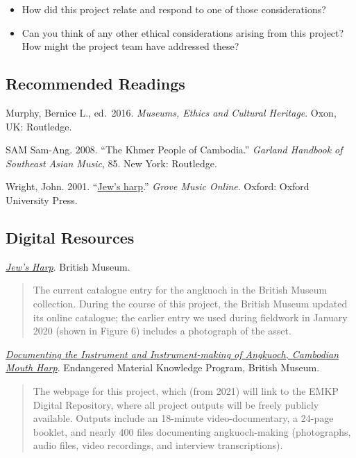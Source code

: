 \documentclass[twoside]{article}
\begin{document}
\begin{itemize}
\item
  How did this project relate and respond to one of those
  considerations?
\item
  Can you think of any other ethical considerations arising from this
  project? How might the project team have addressed these?
\end{itemize}

\hypertarget{recommended-readings}{%
\subsection*{Recommended Readings}\label{recommended-readings}}

Murphy, Bernice L., ed.~2016. \emph{Museums, Ethics and
Cultural Heritage}. Oxon, UK: Routledge.

SAM Sam-Ang. 2008. ``The Khmer People of Cambodia.''
\emph{Garland Handbook of Southeast Asian Music}, 85. New York:
Routledge.

Wright, John. 2001.
``\href{https://www.oxfordmusiconline.com/grovemusic/view/10.1093/gmo/9781561592630.001.0001/omo-9781561592630-e-0000014300}{Jew's
harp}.'' \emph{Grove Music Online}. Oxford: Oxford University Press.

\hypertarget{digital-resources}{%
\subsection*{Digital Resources}\label{digital-resources}}

\href{https://www.britishmuseum.org/collection/object/A_As1966-11-5}{\emph{Jew's
Harp}}. British Museum.

\begin{quote}
The current catalogue entry for the angkuoch in the British Museum
collection. During the course of this project, the British Museum
updated its online catalogue; the earlier entry we used during fieldwork
in January 2020 (shown in Figure 6) includes a photograph of the asset.
\end{quote}

\href{https://www.emkp.org/documentingcambodianmouthharp/}{\emph{Documenting
the Instrument and Instrument-making of Angkuoch, Cambodian Mouth
Harp}}. Endangered Material Knowledge Program, British Museum.

\begin{quote}
The webpage for this project, which (from 2021) will link to the EMKP
Digital Repository, where all project outputs will be freely publicly
available. Outputs include an 18-minute video-documentary, a 24-page
booklet, and nearly 400 files documenting angkuoch-making (photographs,
audio files, video recordings, and interview transcriptions).
\end{quote}
\end{document}
